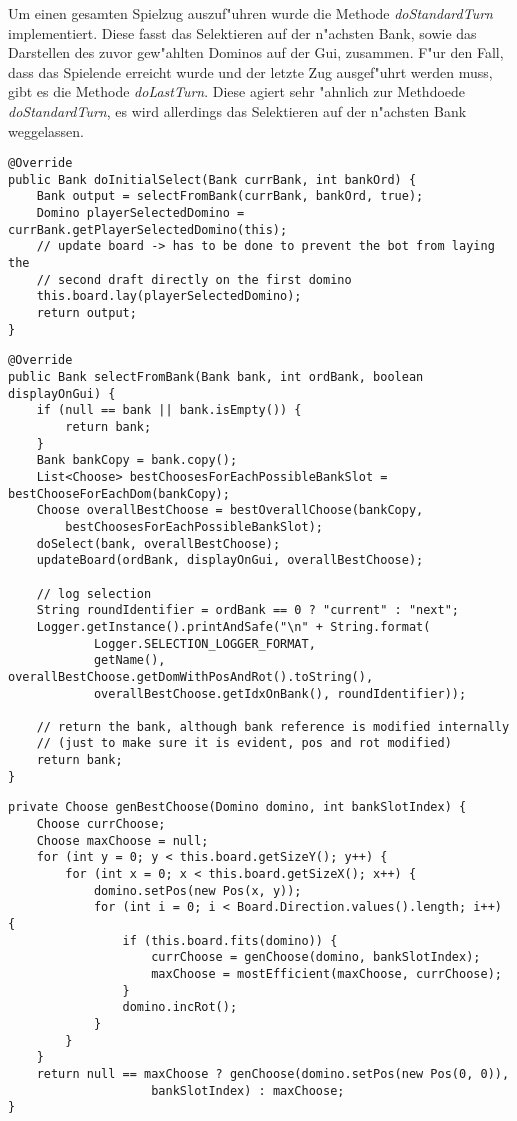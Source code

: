 Um einen gesamten Spielzug auszuf"uhren wurde die Methode \emph{doStandardTurn} implementiert. Diese fasst das Selektieren auf der n"achsten Bank, sowie das Darstellen des zuvor gew"ahlten Dominos auf der Gui, zusammen. F"ur den Fall, dass das Spielende erreicht wurde und der letzte Zug ausgef"uhrt werden muss, gibt es die Methode \emph{doLastTurn}. Diese agiert sehr "ahnlich zur Methdoede \emph{doStandardTurn}, es wird allerdings das Selektieren auf der n"achsten Bank weggelassen. 

\begin{lstlisting}[float,style=CodeHighlighting,caption=DefaultAIPlayer - doInitialSelect,label=lst:defaultAIPlayer_doInitialSelect]
@Override
public Bank doInitialSelect(Bank currBank, int bankOrd) {
    Bank output = selectFromBank(currBank, bankOrd, true);
    Domino playerSelectedDomino = currBank.getPlayerSelectedDomino(this);
    // update board -> has to be done to prevent the bot from laying the
    // second draft directly on the first domino
    this.board.lay(playerSelectedDomino);
    return output;
}
\end{lstlisting}
\begin{lstlisting}[float,style=CodeHighlighting,caption=DefaultAIPlayer - selectFromBank,label=lst:defaultAIPlayer_selectFromBank]
@Override
public Bank selectFromBank(Bank bank, int ordBank, boolean displayOnGui) {
    if (null == bank || bank.isEmpty()) {
        return bank;
    }
    Bank bankCopy = bank.copy();
    List<Choose> bestChoosesForEachPossibleBankSlot = bestChooseForEachDom(bankCopy);
    Choose overallBestChoose = bestOverallChoose(bankCopy, 
    	bestChoosesForEachPossibleBankSlot);
    doSelect(bank, overallBestChoose);
    updateBoard(ordBank, displayOnGui, overallBestChoose);

    // log selection
    String roundIdentifier = ordBank == 0 ? "current" : "next";
    Logger.getInstance().printAndSafe("\n" + String.format(
    		Logger.SELECTION_LOGGER_FORMAT,
            getName(), overallBestChoose.getDomWithPosAndRot().toString(),
            overallBestChoose.getIdxOnBank(), roundIdentifier));

    // return the bank, although bank reference is modified internally
    // (just to make sure it is evident, pos and rot modified)
    return bank;
}
\end{lstlisting}
\begin{lstlisting}[float,style=CodeHighlighting,caption=DefaultAIPlayer - genBestChoose,label=lst:defaultAIPlayer_genBestChoose]
private Choose genBestChoose(Domino domino, int bankSlotIndex) {
    Choose currChoose;
    Choose maxChoose = null;
    for (int y = 0; y < this.board.getSizeY(); y++) {
        for (int x = 0; x < this.board.getSizeX(); x++) {
            domino.setPos(new Pos(x, y));
            for (int i = 0; i < Board.Direction.values().length; i++) {
                if (this.board.fits(domino)) {
                    currChoose = genChoose(domino, bankSlotIndex);
                    maxChoose = mostEfficient(maxChoose, currChoose);
                }
                domino.incRot();
            }
        }
    }
    return null == maxChoose ? genChoose(domino.setPos(new Pos(0, 0)), 
    				bankSlotIndex) : maxChoose;
}
\end{lstlisting}
